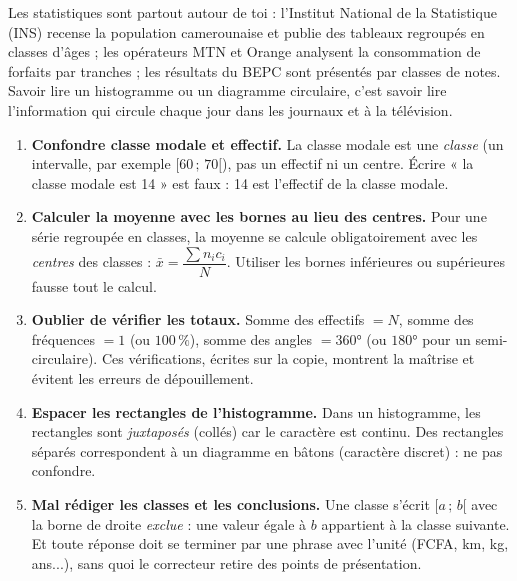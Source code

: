 \documentclass[11pt]{article}
\begin{document}
\begin{savaistu}
Les statistiques sont partout autour de toi : l'Institut National de la Statistique (INS) recense la population camerounaise et publie des tableaux regroupés en classes d'âges ; les opérateurs MTN et Orange analysent la consommation de forfaits par tranches ; les résultats du BEPC sont présentés par classes de notes. Savoir lire un histogramme ou un diagramme circulaire, c'est savoir lire l'information qui circule chaque jour dans les journaux et à la télévision.
\end{savaistu}

\begin{attention}
\begin{enumerate}
\item \textbf{Confondre classe modale et effectif.} La classe modale est une \emph{classe} (un intervalle, par exemple $[60\,;\,70[$), pas un effectif ni un centre. Écrire « la classe modale est 14 » est faux : 14 est l'effectif de la classe modale.
\item \textbf{Calculer la moyenne avec les bornes au lieu des centres.} Pour une série regroupée en classes, la moyenne se calcule obligatoirement avec les \emph{centres} des classes : $\bar{x} = \dfrac{\sum n_i c_i}{N}$. Utiliser les bornes inférieures ou supérieures fausse tout le calcul.
\item \textbf{Oublier de vérifier les totaux.} Somme des effectifs $= N$, somme des fréquences $= 1$ (ou $100\,\%$), somme des angles $= 360°$ (ou $180°$ pour un semi-circulaire). Ces vérifications, écrites sur la copie, montrent la maîtrise et évitent les erreurs de dépouillement.
\item \textbf{Espacer les rectangles de l'histogramme.} Dans un histogramme, les rectangles sont \emph{juxtaposés} (collés) car le caractère est continu. Des rectangles séparés correspondent à un diagramme en bâtons (caractère discret) : ne pas confondre.
\item \textbf{Mal rédiger les classes et les conclusions.} Une classe s'écrit $[a\,;\,b[$ avec la borne de droite \emph{exclue} : une valeur égale à $b$ appartient à la classe suivante. Et toute réponse doit se terminer par une phrase avec l'unité (FCFA, km, kg, ans...), sans quoi le correcteur retire des points de présentation.
\end{enumerate}
\end{attention}

\newpage
\end{document}
